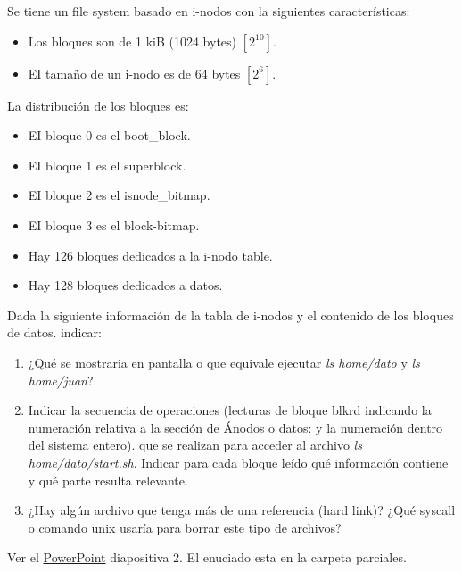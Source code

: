 \documentclass[../main.tex]{subfiles}
\begin{document}
    \begin{exercise}
        Se tiene un file system basado en i-nodos con la siguientes características:
        \begin{itemize}
            \item Los bloques son de 1 kiB (1024 bytes) $[2^10]$.
            \item EI tamaño de un i-nodo es de 64 bytes $[2^6]$.
        \end{itemize}
        La distribución de los bloques es: 
        \begin{itemize}
            \item EI bloque 0 es el boot\_block.
            \item EI bloque 1 es el superblock.
            \item EI bloque 2 es el isnode\_bitmap.
            \item EI bloque 3 es el block-bitmap.
            \item Hay 126 bloques dedicados a la i-nodo table.
            \item Hay 128 bloques dedicados a datos.
        \end{itemize}
        Dada la siguiente información de la tabla de i-nodos y el contenido de los bloques de datos. indicar:
        \begin{enumerate}
            \item ¿Qué se mostraria en pantalla o que equivale ejecutar \textit{ls home/dato} y \textit{ls home/juan}?
            \item Indicar la secuencia de operaciones (lecturas de bloque blkrd indicando la numeración relativa a la sección de Ánodos o datos: y la numeración dentro del sistema entero). que se realizan para acceder al archivo \textit{ls home/dato/start.sh}. Indicar para cada bloque leído qué información contiene y qué parte resulta relevante.
            \item ¿Hay algún archivo que tenga más de una referencia (hard link)? ¿Qué syscall o comando unix usaría para borrar este tipo de archivos?
        \end{enumerate}

        \begin{answer}
            Ver el \href{https://fiubaar-my.sharepoint.com/:p:/g/personal/lcondoriz_fi_uba_ar/ERIlPc9eeJNOg9fCVzz2cjgBsjhy15nYJswfVTfWUNNcTg?e=KJvO2T}{PowerPoint} diapositiva 2. El enuciado esta en la carpeta parciales.\\


\end{answer}
\end{exercise}
\end{document}
